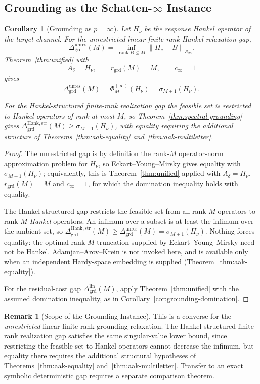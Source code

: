 \documentclass[12pt]{article}
\newtheorem{corollary}[theorem]{Corollary}
\theoremstyle{definition}
\newtheorem{remark}[theorem]{Remark}
\DeclareMathOperator{\rank}{rank}
\newcommand{\norm}[1]{\left\lVert#1\right\rVert}
\newcommand{\GrdLin}{\Delta_{\mathrm{grd}}^{\mathrm{lin}}}
\newcommand{\Dunres}{\Delta_{\mathrm{grd}}^{\mathrm{unres}}}
\newcommand{\DHankstr}{\Delta_{\mathrm{grd}}^{\mathrm{Hank,str}}}
\newcommand{\Sp}[1]{\mathcal S_{#1}}
\begin{document}
\subsection{Grounding as the Schatten-$\infty$ Instance}
\label{subsec:schatten-grounding}

\begin{corollary}[Grounding as $p=\infty$]
\label{cor:grd-schatten}
Let $H_\nu$ be the response Hankel operator of the target channel.  For the
unrestricted linear finite-rank Hankel relaxation gap,
\[
\Dunres(M)
=
\inf_{\rank B\le M}
\norm{H_\nu-B}_{\Sp{\infty}}.
\]
Theorem~\ref{thm:unified} with
\[
A_\delta=H_\nu,
\qquad
r_{\mathrm{grd}}(M)=M,
\qquad
c_\infty=1
\]
gives
\[
\Dunres(M)
=
\Phi^{(\infty)}_M(H_\nu)
=
\sigma_{M+1}(H_\nu).
\]

For the Hankel-structured finite-rank realization gap the feasible set is
restricted to Hankel operators of rank at most $M$, so
Theorem~\ref{thm:spectral-grounding} gives
$\DHankstr(M)\ge\sigma_{M+1}(H_\nu)$, with equality requiring the additional
structure of Theorems~\ref{thm:aak-equality} and~\ref{thm:aak-multiletter}.
\end{corollary}

\begin{proof}
The unrestricted gap is by definition the rank-$M$ operator-norm approximation
problem for $H_\nu$, so Eckart--Young--Mirsky
\cite{eckart1936,mirsky1960} gives equality with $\sigma_{M+1}(H_\nu)$;
equivalently, this is Theorem~\ref{thm:unified} applied with $A_\delta=H_\nu$,
$r_{\mathrm{grd}}(M)=M$ and $c_\infty=1$, for which the domination inequality
holds with equality.

The Hankel-structured gap restricts the feasible set from all rank-$M$
operators to rank-$M$ \emph{Hankel} operators.  An infimum over a subset is at
least the infimum over the ambient set, so
$\DHankstr(M)\ge\Dunres(M)=\sigma_{M+1}(H_\nu)$.  Nothing forces equality: the
optimal rank-$M$ truncation supplied by Eckart--Young--Mirsky need not be
Hankel.  Adamjan--Arov--Krein is not invoked here, and is available only when
an independent Hardy-space embedding is supplied
(Theorem~\ref{thm:aak-equality}).

For the residual-cost gap $\GrdLin(M)$, apply Theorem~\ref{thm:unified} with
the assumed domination inequality, as in
Corollary~\ref{cor:grounding-domination}.
\end{proof}

\begin{remark}[Scope of the Grounding Instance]
\label{rem:grd-schatten-scope}
This is a converse for the \emph{unrestricted} linear finite-rank grounding
relaxation.  The Hankel-structured finite-rank realization gap satisfies the
same singular-value lower bound, since restricting the feasible set to Hankel
operators cannot decrease the infimum, but equality there requires the
additional structural hypotheses of Theorems~\ref{thm:aak-equality}
and~\ref{thm:aak-multiletter}.  Transfer to an exact symbolic deterministic gap
requires a separate comparison theorem.
\end{remark}
\end{document}
